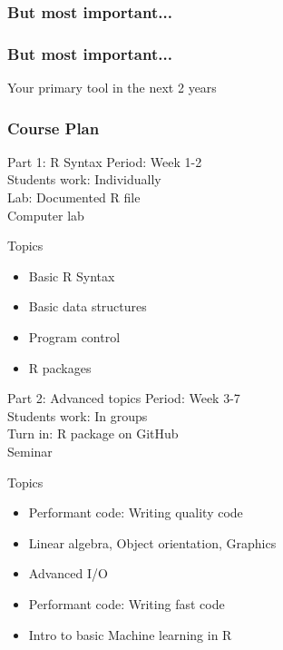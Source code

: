 \documentclass{beamer}
\begin{document}
\begin{frame}
	\frametitle{But most important...}
\end{frame}

\begin{frame}
	\frametitle{But most important...}
	Your primary tool in the next 2 years
\end{frame}


\begin{frame}
\frametitle{Course Plan}
\begin{block}{Part 1: R Syntax}
Period: Week 1-2 \\
Students work: Individually \\
Lab: Documented R file \\
Computer lab \\
\end{block}
\begin{block}{Topics}
	\begin{itemize}
		\item Basic R Syntax
		\item Basic data structures
		\item Program control
		\item R packages
	\end{itemize}
\end{block}
\end{frame}

\begin{frame}
\begin{block}{Part 2: Advanced topics}
Period: Week 3-7 \\
Students work: In groups \\
Turn in: R package on GitHub \\
Seminar \\
\end{block}

\begin{block}{Topics}
	\begin{itemize}
		\item Performant code: Writing quality code
		\item Linear algebra, Object orientation, Graphics
		\item Advanced I/O
		\item Performant code: Writing fast code
		\item Intro to basic Machine learning in R
	\end{itemize}
\end{block}
\end{frame}
\end{document}
